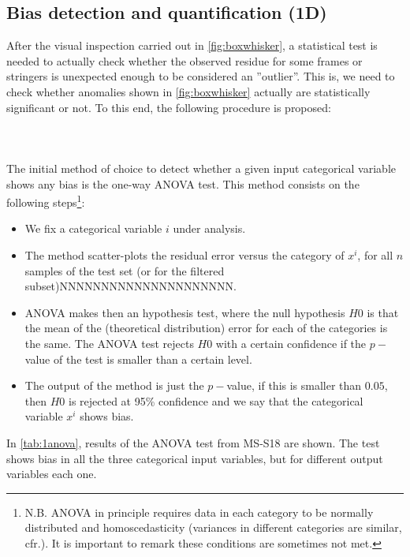 \subsection{Bias detection and quantification (1D)}\label{subsec:biasinput1d}
After the visual inspection carried out in \autoref{fig:boxwhisker}, a statistical test is needed to actually check whether the observed residue for some frames or stringers is unexpected enough to be considered an ''outlier''. This is, we need to check whether anomalies shown in \autoref{fig:boxwhisker} actually are statistically significant or not. To this end, the following procedure is proposed:\\

\paragraph{ \\}
The initial method of choice to detect whether a given input categorical variable shows any bias is the one-way ANOVA test\cite{kim2017understanding}. This method consists on the following steps\footnote{N.B. ANOVA in principle requires data in each category to be normally distributed and homoscedasticity (variances in different categories are similar, cfr.\cite[p. 374]{jobson2012applied}). It is important to remark these conditions are sometimes not met.}:
\begin{itemize}
	\item We fix a categorical variable $i$ under analysis.
	\item The method scatter-plots the residual error versus the category of $x^i$, for all $n$ samples of the test set (or for the filtered subset)NNNNNNNNNNNNNNNNNNNNN.
	\item ANOVA makes then an hypothesis test, where the null hypothesis $H0$ is that the mean of the (theoretical distribution) error for each of the categories is the same. The ANOVA test rejects $H0$ with a certain confidence if the $p-$value of the test is smaller than a certain level.
	\item The output of the method is just the $p-$value, if this is smaller than $0.05$,  then $H0$ is rejected at 95\% confidence and we say that the categorical variable $x^i$ shows bias.\\
\end{itemize}
%
\indent In \autoref{tab:1anova}, results of the ANOVA test from MS-S18 are shown. The test shows bias in all the three categorical input variables, but for different output variables each one.\\
